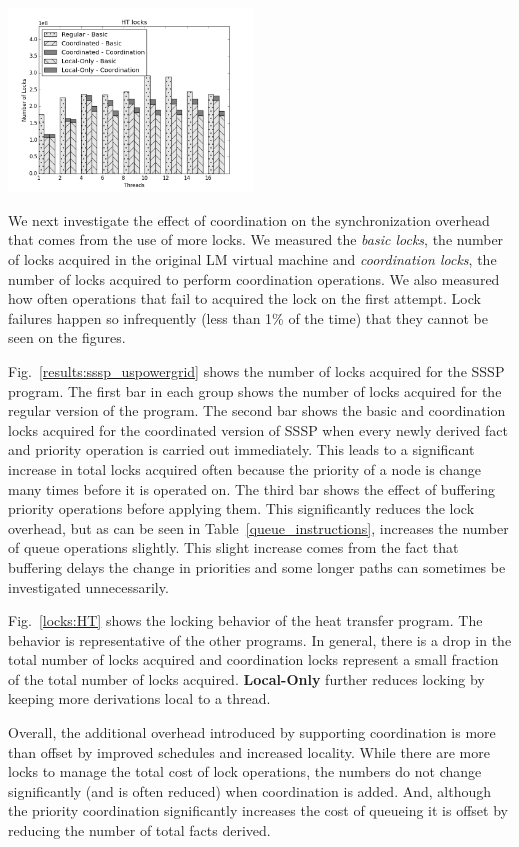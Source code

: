 \begin{topfig}
   \begin{center}
      \includegraphics[width=6.5cm]{results/locks/ht-locks.png}
   \end{center}
\end{topfig}

We next investigate the effect of coordination on the synchronization
overhead that comes from the use of more locks.  We measured the
\emph{basic locks}, the number of locks acquired
in the original LM virtual machine and \emph{coordination locks}, the
number of locks acquired to perform coordination operations.  We also
measured how often  operations that fail to acquired
the lock on the first attempt.  Lock failures happen so infrequently
(less than 1\% of the time) that they cannot be seen on the figures.

Fig.~\ref{results:sssp_uspowergrid} shows the number of locks acquired
for the SSSP program.  The first bar in each group shows the number of
locks acquired for the regular version of the program.  The
second bar shows the basic and coordination locks acquired for the coordinated
version of SSSP when every newly derived fact and priority operation is carried out
immediately.  This leads to a significant increase in total locks
acquired often because the priority of a node is change many times
before it is operated on.  The third bar shows the effect of buffering
priority operations before applying them.  This significantly reduces
the lock overhead, but as can be seen in
Table~\ref{queue_instructions}, increases the number of queue operations
slightly.  This slight increase comes from the fact that buffering
delays the change in priorities and some longer paths can sometimes be
investigated unnecessarily.

Fig.~\ref{locks:HT} shows the locking behavior of the heat transfer
program.  The behavior is representative of the other programs. In general, there
is a drop in the total number of locks acquired and coordination locks
represent a small fraction of the total number of locks acquired. \textbf{Local-Only}
further reduces locking by keeping more derivations local to a thread.

Overall, the additional overhead introduced by supporting coordination
is more than offset by improved schedules and increased locality.
While there are more locks to manage the total cost of lock operations,
the numbers do not change significantly (and is often reduced) when coordination
is added.  And, although the priority coordination significantly
increases the cost of queueing it is offset by reducing the number of
total facts derived.
